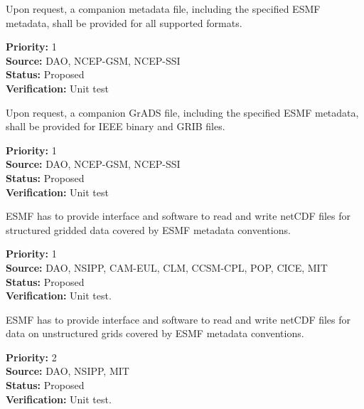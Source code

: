 Upon request, a companion metadata file, including the specified ESMF
metadata, shall be provided for all supported formats.

\begin{reqlist}
{\bf Priority:} 1 \\
{\bf Source:} DAO, NCEP-GSM, NCEP-SSI \\
{\bf Status:} Proposed \\
{\bf Verification:} Unit test \\
\end{reqlist}


Upon request, a companion GrADS file, including the specified ESMF
metadata, shall be provided for IEEE binary and GRIB files.

\begin{reqlist}
{\bf Priority:} 1 \\
{\bf Source:} DAO, NCEP-GSM, NCEP-SSI \\
{\bf Status:} Proposed \\
{\bf Verification:} Unit test \\
\end{reqlist}






ESMF has to provide interface and software to read and write netCDF
files for structured gridded data covered by ESMF metadata conventions. 

\begin{reqlist}
{\bf Priority:} 1 \\
{\bf Source:} DAO, NSIPP, CAM-EUL, CLM, CCSM-CPL, POP, CICE, MIT \\
{\bf Status:} Proposed \\
{\bf Verification:} Unit test. \\
\end{reqlist}



ESMF has to provide interface and software to read and write netCDF
files for data on unstructured grids covered by ESMF metadata conventions. 

\begin{reqlist}
{\bf Priority:} 2 \\
{\bf Source:} DAO, NSIPP, MIT \\
{\bf Status:} Proposed \\
{\bf Verification:} Unit test. \\
\end{reqlist}


